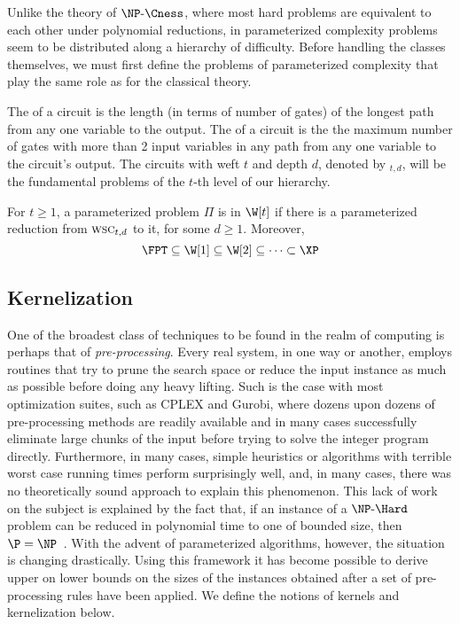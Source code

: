Unlike the theory of $\NPcness$, where most hard problems are equivalent to each other under polynomial reductions, in parameterized complexity problems seem to be distributed along a hierarchy of difficulty.
Before handling the classes themselves, we must first define the problems of parameterized complexity that play the same role as  for the classical theory. 

The  of a circuit is the length (in terms of number of gates) of the longest path from any one variable to the output.
The  of a circuit is the the maximum number of gates with more than 2 input variables in any path from any one variable to the circuit's output.
The circuits with weft $t$ and depth $d$, denoted by $_{t,d}$, will be the fundamental problems of the $t$-th level of our hierarchy.


\begin{class_definition*}[$\W$-hierarchy]
    For $t \geq 1$, a parameterized problem $\Pi$ is in $\W[t]$ if there is a parameterized reduction from $\textsc{wsc}_{t,d}$ to it, for some $d \geq 1$. Moreover,
    \begin{equation*}
        \FPT \subseteq \W[1] \subseteq \W[2] \subseteq \cdots \subset \XP
    \end{equation*}
\end{class_definition*}


\subsection{Kernelization}

One of the broadest class of techniques to be found in the realm of computing is perhaps that of \textit{pre-processing}.
Every real system, in one way or another, employs routines that try to prune the search space or reduce the input instance as much as possible before doing any heavy lifting.
Such is the case with most optimization suites, such as CPLEX and Gurobi, where dozens upon dozens of pre-processing methods are readily available and in many cases successfully eliminate large chunks of the input before trying to solve the integer program directly.
Furthermore, in many cases, simple heuristics or algorithms with terrible worst case running times perform surprisingly well, and, in many cases, there was no theoretically sound approach to explain this phenomenon.
This lack of work on the subject is explained by the fact that, if an instance of a $\NPH$ problem can be reduced in polynomial time to one of bounded size, then $\P = \NP$~\citep{book-kernels}.
With the advent of parameterized algorithms, however, the situation is changing drastically.
Using this framework it has become possible to derive upper on lower bounds on the sizes of the instances obtained after a set of pre-processing rules have been applied.
We define the notions of kernels and kernelization below.

